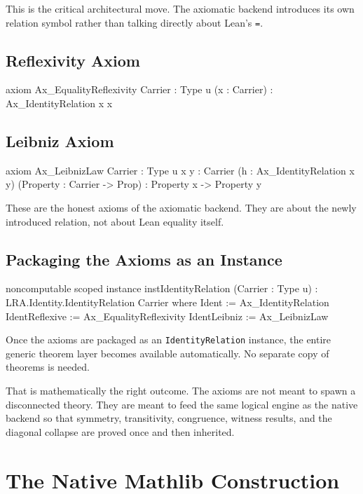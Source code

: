 \documentclass[11pt]{article}
\newcommand{\leaninline}[1]{\texttt{#1}}
\begin{document}
This is the critical architectural move. The axiomatic backend introduces its own relation symbol rather than talking directly about Lean's \leaninline{=}.

\subsection{Reflexivity Axiom}

\begin{leanblock}
axiom Ax_EqualityReflexivity {Carrier : Type u} (x : Carrier) :
    Ax_IdentityRelation x x
\end{leanblock}

\subsection{Leibniz Axiom}

\begin{leanblock}
axiom Ax_LeibnizLaw {Carrier : Type u} {x y : Carrier}
    (h : Ax_IdentityRelation x y) (Property : Carrier -> Prop) :
    Property x -> Property y
\end{leanblock}

These are the honest axioms of the axiomatic backend. They are about the newly introduced relation, not about Lean equality itself.

\subsection{Packaging the Axioms as an Instance}

\begin{leanblock}
noncomputable scoped instance instIdentityRelation (Carrier : Type u) :
    LRA.Identity.IdentityRelation Carrier where
  Ident := Ax_IdentityRelation
  IdentReflexive := Ax_EqualityReflexivity
  IdentLeibniz := Ax_LeibnizLaw
\end{leanblock}

Once the axioms are packaged as an \leaninline{IdentityRelation} instance, the entire generic theorem layer becomes available automatically. No separate copy of theorems is needed.

That is mathematically the right outcome. The axioms are not meant to spawn a disconnected theory. They are meant to feed the same logical engine as the native backend so that symmetry, transitivity, congruence, witness results, and the diagonal collapse are proved once and then inherited.

\section{The Native Mathlib Construction}
\end{document}
